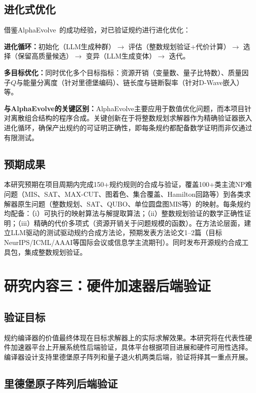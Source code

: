 \subsection{进化式优化}

借鉴AlphaEvolve~\cite{AlphaEvolve2025}的成功经验，对已验证规约进行进化优化：

\textbf{进化循环：}初始化（LLM生成种群）$\to$ 评估（整数规划验证+代价计算）$\to$ 选择（保留高质量候选）$\to$ 变异（LLM生成变体）$\to$ 迭代。

\textbf{多目标优化：}同时优化多个目标指标：资源开销（变量数、量子比特数）、质量因子$Q$与能量分离度（针对里德堡编码）、链长度与链断裂率（针对D-Wave嵌入）等。

\textbf{与AlphaEvolve的关键区别：}AlphaEvolve主要应用于数值优化问题，而本项目针对离散组合结构的程序合成。关键创新在于将整数规划求解器作为精确验证器嵌入进化循环，确保产出规约的可证明正确性，即每条规约都配备数学证明而非仅通过有限测试。

\subsection{预期成果}

本研究预期在项目周期内完成150+规约规则的合成与验证，覆盖100+类主流NP难问题（MIS、SAT、MAX-CUT、图着色、集合覆盖、Hamilton回路等）到各类求解器原生问题（整数规划、SAT、QUBO、单位圆盘图MIS等）的映射。每条规约均配备：（i）可执行的映射算法与解提取算法；（ii）整数规划验证的数学正确性证明；（iii）精确的代价多项式（资源开销关于问题规模的函数）。在方法论层面，建立LLM驱动的测试驱动规约合成方法论，预期发表方法论文1--2篇（目标NeurIPS/ICML/AAAI等国际会议或信息学主流期刊）。同时发布开源规约合成工具包，集成整数规划验证。


\section{研究内容三：硬件加速器后端验证}

\subsection{验证目标}

规约编译器的价值最终体现在目标求解器上的实际求解效果。本研究将在代表性硬件加速器平台上开展系统性后端验证，具体平台根据项目进展和硬件可用性选择。编译器设计支持里德堡原子阵列和量子退火机两类后端，验证将择其一重点开展。

\subsection{里德堡原子阵列后端验证}

